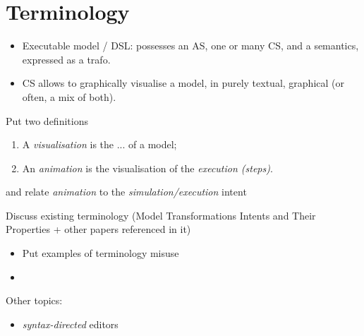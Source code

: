 \section{Terminology}
\label{sec:Terminology}

\begin{itemize}
	\item Executable model / DSL: possesses an AS, one or many CS, and a semantics,
   expressed as a trafo.
   
   \item CS allows to graphically visualise a model, in purely textual, graphical
   (or often, a mix of both).
\end{itemize}

\medskip
Put two definitions
\begin{enumerate}
	\item A \emph{visualisation} is the ... of a model;
   \item An \emph{animation} is the visualisation of the \emph{execution (steps)}.
\end{enumerate}
and relate \emph{animation} to the \emph{simulation/execution} intent

\medskip
Discuss existing terminology (Model Transformations Intents and Their Properties
 + other papers referenced in it)

\medskip
\begin{itemize}
	\item Put examples of terminology misuse
   \item 
\end{itemize}

Other topics:
\begin{itemize}
	\item \emph{syntax-directed} editors
\end{itemize}